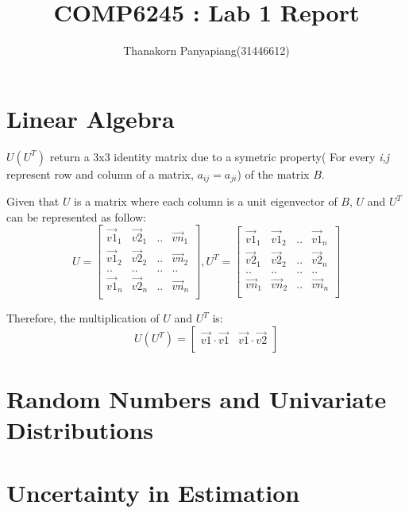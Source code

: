 \documentclass{article}
\title{COMP6245 : Lab 1 Report}
\author{Thanakorn Panyapiang(31446612)}
\begin{document}
\maketitle
\section{Linear Algebra}
$U(U^{T})$ return a 3x3 identity matrix due to a symetric property( For every \textit{i,j} represent row and column of a matrix, $a_{ij} = a_{ji}$) of the matrix $B$.

Given that $U$ is a matrix where each column is a unit eigenvector of $B$, $U$ and $U^{T}$ can be represented as follow:
$$
U = \begin{bmatrix} 
\vec{v1}_{1} & \vec{v2}_{1} & .. & \vec{vn}_{1}\\
\vec{v1}_{2} & \vec{v2}_{2} & .. & \vec{vn}_{2}\\
..	& .. & .. & .. \\
\vec{v1}_{n} & \vec{v2}_{n} & .. & \vec{vn}_{n}\\
\end{bmatrix},
U^{T} = \begin{bmatrix}
\vec{v1}_{1} & \vec{v1}_{2} & .. & \vec{v1}_{n}\\
\vec{v2}_{1} & \vec{v2}_{2} & .. & \vec{v2}_{n}\\
.. & .. & .. & ..\\
\vec{vn}_{1} & \vec{vn}_{2} & .. & \vec{vn}_{n}\\
\end{bmatrix}
$$

Therefore, the multiplication of $U$ and $U^{T}$ is:
$$
U(U^{T}) = \begin{bmatrix}
\vec{v1}\cdot\vec{v1} & \vec{v1}\cdot\vec{v2}\\
\end{bmatrix}
$$

\maketitle
\section{Random Numbers and Univariate Distributions}

\maketitle
\section{Uncertainty in Estimation}
\end{document}
